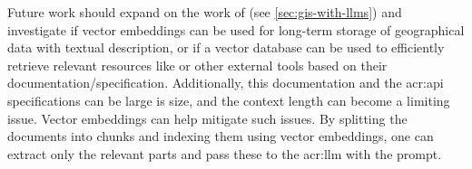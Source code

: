 Future work should expand on the work of \cite{unluChatmapLargeLanguage2023} (see \autoref{sec:gis-with-llms}) and investigate if vector embeddings can be used for long-term storage of geographical data with textual description, or if a vector database can be used to efficiently retrieve relevant resources like  or other external tools based on their documentation/specification. Additionally, this documentation and the \acrshort{acr:api} specifications can be large is size, and the context length can become a limiting issue. Vector embeddings can help mitigate such issues. By splitting the documents into chunks and indexing them using vector embeddings, one can extract only the relevant parts and pass these to the \acrshort{acr:llm} with the prompt.

\glsaddall